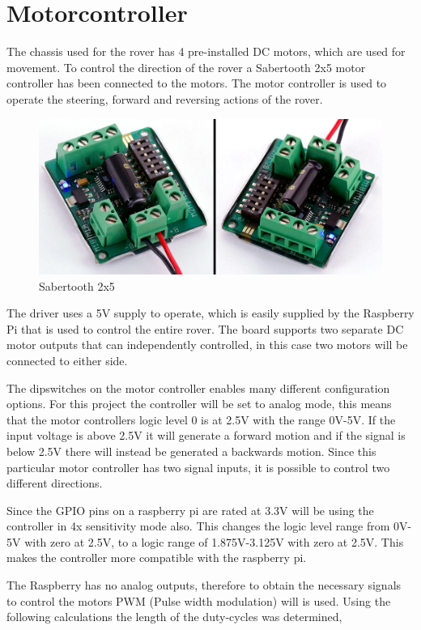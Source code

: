 \clearpage
\section{Motorcontroller}

The chassis used for the rover has 4 pre-installed DC motors, which are used for movement. To control the direction of the rover a Sabertooth 2x5 motor controller has been connected to the motors. The motor controller is used to operate the steering, forward and reversing actions of the rover.

\begin{figure}[H]
	\centering
	\includegraphics[width=.8\linewidth]{images/Sabertooth2X5big.jpg}
	\caption{Sabertooth 2x5\cite{sabertoothpic}}
\end{figure}

The driver uses a 5V supply to operate, which is easily supplied by the Raspberry Pi that is used to control the entire rover. The board supports two separate DC motor outputs that can independently controlled, in this case two motors will be connected to either side.

The dipswitches on the motor controller enables many different configuration options. For this project the controller will be set to analog mode, this means that the motor controllers logic level 0 is at 2.5V with the range 0V-5V. If the input voltage is above 2.5V it will generate a forward motion and if the signal is below 2.5V there will instead be generated a backwards motion. Since this particular motor controller has two signal inputs, it is possible to control two different directions\cite{sabertoothdata}.

Since the GPIO pins on a raspberry pi are rated at 3.3V will be using the controller in 4x sensitivity mode also. This changes the logic level range from 0V-5V with zero at 2.5V, to a logic range of 1.875V-3.125V with zero at 2.5V.  
This makes the controller more compatible with the raspberry pi.

The Raspberry has no analog outputs, therefore to obtain the necessary signals to control the motors PWM (Pulse width modulation) will is used. Using the following calculations the length of the duty-cycles was determined,

